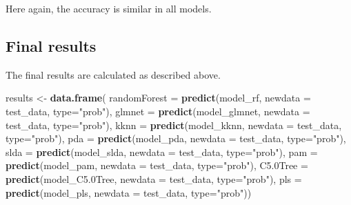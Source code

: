 \documentclass[]{book}
\newenvironment{Shaded}{\begin{snugshade}}{\end{snugshade}}
\newcommand{\DataTypeTok}[1]{\textcolor[rgb]{0.13,0.29,0.53}{#1}}
\newcommand{\FloatTok}[1]{\textcolor[rgb]{0.00,0.00,0.81}{#1}}
\newcommand{\KeywordTok}[1]{\textcolor[rgb]{0.13,0.29,0.53}{\textbf{#1}}}
\newcommand{\NormalTok}[1]{#1}
\newcommand{\StringTok}[1]{\textcolor[rgb]{0.31,0.60,0.02}{#1}}
\begin{document}
Here again, the accuracy is similar in all models.

\hypertarget{final-results}{%
\subsection{Final results}\label{final-results}}

The final results are calculated as described above.

\begin{Shaded}
\begin{Highlighting}[]
\NormalTok{results <-}\StringTok{ }\KeywordTok{data.frame}\NormalTok{(}
  \DataTypeTok{randomForest =} \KeywordTok{predict}\NormalTok{(model_rf, }\DataTypeTok{newdata =}\NormalTok{ test_data, }\DataTypeTok{type=}\StringTok{"prob"}\NormalTok{),}
  \DataTypeTok{glmnet =} \KeywordTok{predict}\NormalTok{(model_glmnet, }\DataTypeTok{newdata =}\NormalTok{ test_data, }\DataTypeTok{type=}\StringTok{"prob"}\NormalTok{),}
  \DataTypeTok{kknn =} \KeywordTok{predict}\NormalTok{(model_kknn, }\DataTypeTok{newdata =}\NormalTok{ test_data, }\DataTypeTok{type=}\StringTok{"prob"}\NormalTok{),}
  \DataTypeTok{pda =} \KeywordTok{predict}\NormalTok{(model_pda, }\DataTypeTok{newdata =}\NormalTok{ test_data, }\DataTypeTok{type=}\StringTok{"prob"}\NormalTok{),}
  \DataTypeTok{slda =} \KeywordTok{predict}\NormalTok{(model_slda, }\DataTypeTok{newdata =}\NormalTok{ test_data, }\DataTypeTok{type=}\StringTok{"prob"}\NormalTok{),}
  \DataTypeTok{pam =} \KeywordTok{predict}\NormalTok{(model_pam, }\DataTypeTok{newdata =}\NormalTok{ test_data, }\DataTypeTok{type=}\StringTok{"prob"}\NormalTok{),}
  \DataTypeTok{C5.0Tree =} \KeywordTok{predict}\NormalTok{(model_C5}\FloatTok{.0}\NormalTok{Tree, }\DataTypeTok{newdata =}\NormalTok{ test_data, }\DataTypeTok{type=}\StringTok{"prob"}\NormalTok{),}
  \DataTypeTok{pls =} \KeywordTok{predict}\NormalTok{(model_pls, }\DataTypeTok{newdata =}\NormalTok{ test_data, }\DataTypeTok{type=}\StringTok{"prob"}\NormalTok{))}


\end{Highlighting}
\end{Shaded}
\end{document}

